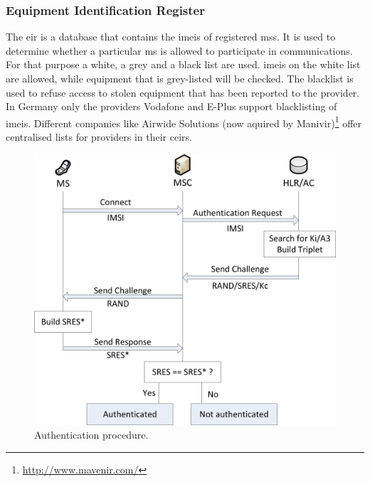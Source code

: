 \subsubsection{Equipment Identification Register}
The \gls{eir} is a database that contains the \glspl{imei} of registered \glspl{ms}.
It is used to determine whether a particular \gls{ms} is allowed to participate in communications.
For that purpose a white, a grey and a black list are used.
\glspl{imei} on the white list are allowed, while equipment that is grey-listed will be checked.
The blacklist is used to refuse access to \eg stolen equipment that has been reported to the provider.
In Germany only the providers Vodafone and E-Plus support blacklisting of \glspl{imei}\cite{blacklisting}.
Different companies like Airwide Solutions (now aquired by Manivir)\footnote{\url{http://www.mavenir.com/}} offer centralised lists for providers in their \glspl{ceir}.

\begin{figure}
\centering
\includegraphics{../Images/Authentication}
\caption{Authentication procedure.}
\label{fig:authentication}
\end{figure}
